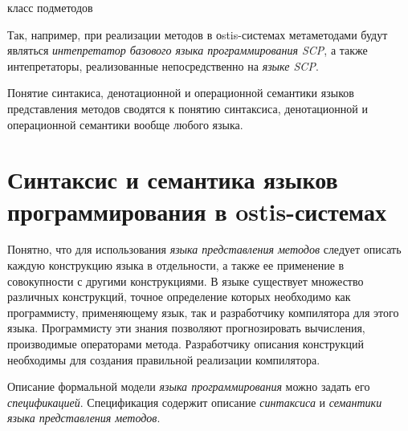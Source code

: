 \begin{SCn}
\begin{scnrelfromlist}{класс подметодов}
\end{scnrelfromlist}
\end{SCn}

Так, например, при реализации методов в оstis-системах метаметодами будут являться \textit{интепретатор базового языка программирования SCP}, а также интепретаторы, реализованные непосредственно на \textit{языке SCP}. 

Понятие синтакиса, денотационной и операционной семантики языков представления методов сводятся к понятию синтаксиса, денотационной и операционной семантики вообще любого языка.

\section{Синтаксис и семантика языков программирования в ostis-системах}
\label{sec_programs_method_representation_language_syntax_and_semantic}

Понятно, что для использования \textit{языка представления методов} следует описать каждую конструкцию языка в отдельности, а также ее применение в совокупности с другими конструкциями. В языке существует множество различных конструкций, точное определение которых необходимо как программисту, применяющему язык, так и разработчику компилятора для этого языка. Программисту эти знания позволяют прогнозировать вычисления, производимые операторами метода. Разработчику описания конструкций необходимы для создания правильной реализации компилятора.

Описание формальной модели \textit{языка программирования} можно задать его \textit{спецификацией}. Спецификация содержит описание \textit{синтаксиса} и \textit{семантики языка представления методов}.

